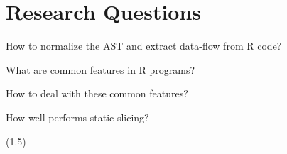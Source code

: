 \section[RQs]{Research Questions}
{\def\G{\only<7->{\color{lightgray}}}
\begin{frame}[c]{\insertsection}
   \begin{description}
      \itemsep12pt
      \item<2->[RQ1:] %
      How to normalize the AST and extract data-flow from R code?
      \item<3->[RQ2:] What are common features in R programs?
      \item<4->[\G RQ3:] \G How to deal with these common features?
      \item<5->[\G RQ4:] \G How well performs static slicing?
   \end{description}
(1.5)%
\end{frame}
}